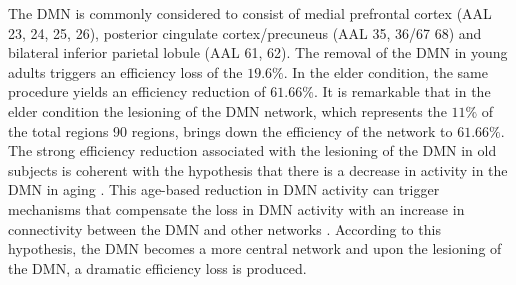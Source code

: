 \documentclass[12pt,a4paper]{article}
\begin{document}
The DMN is commonly considered to consist of medial prefrontal cortex
(AAL 23, 24, 25, 26), posterior cingulate cortex/precuneus (AAL 35, 36/67 68)
and bilateral inferior parietal lobule (AAL 61, 62). 
The removal of the DMN in
young adults triggers an efficiency loss of the $19.6\%$. In the elder condition, the same procedure yields an efficiency reduction of $61.66\%$. It is remarkable that in the elder condition the lesioning of the DMN network, which represents the $11\%$ of the total regions 90 regions, brings down the efficiency of the network to $61.66\%$.
The strong efficiency reduction associated with the lesioning of the DMN in old subjects is coherent with the hypothesis that there is a decrease in activity in the DMN in aging \citep{koch_effects_2010}. This age-based reduction in DMN activity can trigger mechanisms that compensate the loss in DMN activity with an increase in connectivity between the DMN and other networks \citep{damoiseaux_reduced_2008}. According to this hypothesis, the DMN becomes a more central network and upon the lesioning of the DMN, a dramatic efficiency loss is produced. 

\end{document}
